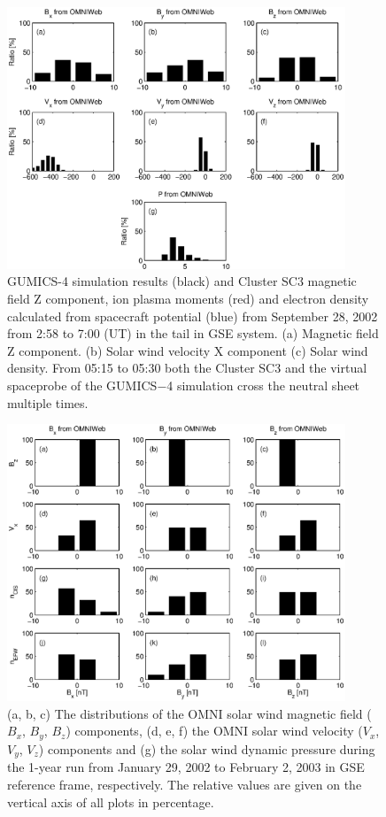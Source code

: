 \documentclass[linenumbers,draft]{agujournal}
\begin{document}
\begin{figure}[h]
\centering
\includegraphics[width=0.9\textwidth,angle=0]{swe-2020-corr-f13.eps}  
\caption{GUMICS-4 simulation results (black) and Cluster SC3 magnetic field Z component, ion plasma moments (red) and electron density calculated from spacecraft potential (blue) from September 28, 2002 from 2:58 to 7:00 (UT) in the tail in GSE system. (a) Magnetic field Z component. (b) Solar wind velocity X component (c) Solar wind density. From 05:15 to 05:30 both the Cluster SC3 and the virtual spaceprobe of the GUMICS$-$4 simulation cross the neutral sheet multiple times.}
\label{fig:nsplot}
\end{figure}

\pagebreak

\begin{figure}[h]
\centering
\includegraphics[width=0.9\textwidth,angle=0]{swe-2020-corr-f14.eps}  
\caption{(a, b, c) The distributions of the OMNI solar wind magnetic field ($B_{x}$, $B_{y}$, $B_{z}$) components, (d, e, f) the OMNI solar wind velocity ($V_{x}$, $V_{y}$, $V_{z}$) components and (g) the solar wind dynamic pressure during the 1-year run from January 29, 2002 to February 2, 2003 in GSE reference frame, respectively. The relative values are given on the vertical axis of all plots in percentage.}
\label{fig:omnidist}
\end{figure}
\end{document}
